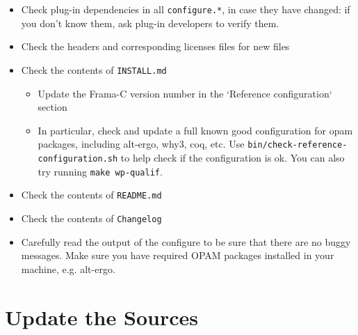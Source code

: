 \begin{itemize}

\item Check plug-in dependencies in all \texttt{configure.*}, in case they have
  changed: if you don't know them, ask plug-in developers to verify them.


\item Check the headers and corresponding licenses files for new files



\item Check the contents of \texttt{INSTALL.md} 
  \begin{itemize}
    \item Update the Frama-C version number in the `Reference configuration` section
    \item In particular, check and update a full known good configuration for
    opam packages, including alt-ergo, why3, coq, etc.
    Use \verb+bin/check-reference-configuration.sh+ to help check if the
    configuration is ok. You can also try running
    \verb+make wp-qualif+.
  \end{itemize}
\item Check the contents of \texttt{README.md} 
\item Check the contents of \texttt{Changelog}
\item Carefully read the output of the configure to be sure that there are no
  buggy messages. Make sure you have required OPAM packages installed in your machine,
  e.g. alt-ergo.
\end{itemize}

\section{Update the Sources}\label{sec:update-sources}

